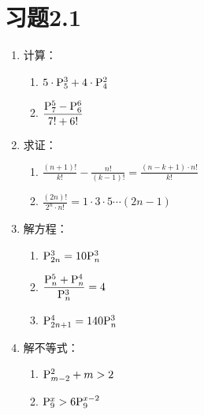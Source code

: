 \section*{习题2.1}
\begin{enumerate}
    \item 计算：
\begin{multicols}{2}
\begin{enumerate}[(1)]
    \item $5\cdot {\rm P}^{3}_{5}+4\cdot {\rm P}^{2}_{4}$
    \item $\dfrac{{\rm P}^{5}_{7}-{\rm P}^{6}_{6}}{7!+6!}$
\end{enumerate}
\end{multicols}

\item 求证：
\begin{enumerate}[(1)]
    \item $\frac{(n+1)!}{k!}-\frac{n!}{(k-1)!}=\frac{(n-k+1)\cdot n!}{k!}$
    \item $\frac{(2n)!}{2^n \cdot n!}=1\cdot 3\cdot 5\cdots (2n-1)$
\end{enumerate}

\item 解方程：
\begin{multicols}{2}
\begin{enumerate}[(1)]
    \item ${\rm P}^{3}_{2n}=10{\rm P}^{3}_{n}$
    \item $\dfrac{{\rm P}^{5}_{n}+{\rm P}^{4}_{n}}{{\rm P}^{3}_{n}}=4$
    \item ${\rm P}^{4}_{2n+1}=140{\rm P}^{3}_{n}$
\end{enumerate}
\end{multicols}

\item 解不等式：
\begin{multicols}{2}
\begin{enumerate}[(1)]
    \item ${\rm P}^{2}_{m-2}+m>2$
    \item ${\rm P}^{x}_{9}>6{\rm P}^{x-2}_{9}$
\end{enumerate}
\end{multicols}


\end{enumerate}
